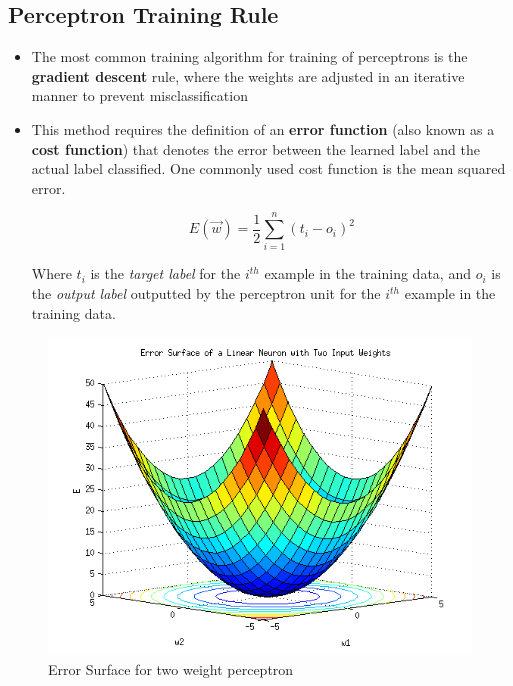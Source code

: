 \documentclass{article}
\theoremstyle{plain}
\theoremstyle{definition}
\begin{document}
\subsection{Perceptron Training Rule}
\begin{itemize}
    \item The most common training algorithm for training of perceptrons is the \textbf{gradient descent} rule, where the weights are adjusted in an iterative manner to prevent misclassification
    
    \item This method requires the definition of an \textbf{error function} (also known as a \textbf{cost function}) that denotes the error between the learned label and the actual label classified. One commonly used cost function is the mean squared error. 
    
    \begin{equation}
        E(\overrightarrow{w}) = \frac{1}{2} \sum_{i=1}^{n} (t_i - o_i)^2
    \end{equation}
    
    Where $t_i$ is the \textit{target label} for the $i^{th}$ example in the training data, and $o_i$ is the \textit{output label} outputted by the perceptron unit for the $i^{th}$ example in the training data. 
\end{itemize}

\begin{figure}[!h]
    \centering
    \includegraphics[scale = 0.6]{err.png}
    \caption{Error Surface for two weight perceptron}
    \label{fig:err}
\end{figure}
\end{document}
